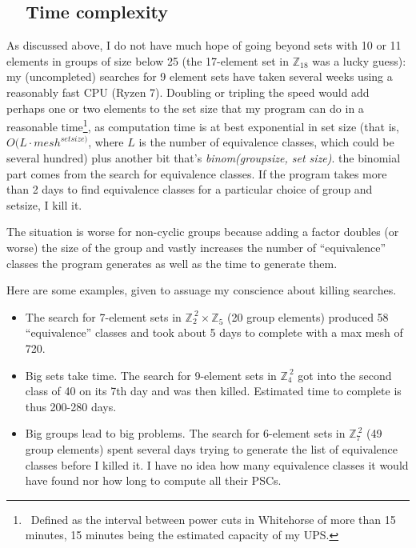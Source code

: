 \documentclass[letter,11pt]{amsart}
\numberwithin{theorem}{section}
\theoremstyle{remark}
\numberwithin{equation}{section}
\newcommand\Zp[2]{\texttt{$\mathbb Z_{#1}^{\	#2}$}}
\newcommand\proofBitFormat[1]{\textit{#1}}
\begin{document}
\subsection{\ \ Time complexity} \label{secTimeComplexity}  As discussed above,  I do not have much hope of going beyond sets with 10 or 11 elements in groups of size below 25 (the 17-element set
  in \Zp{18}{} was a lucky guess):  my (uncompleted) searches for 9 element sets
   have taken several weeks using a reasonably fast CPU (Ryzen 7). Doubling or tripling the speed would add 
   perhaps one or two elements to the set size that my program can do in a reasonable time\footnote{\ Defined as the interval between power cuts in Whitehorse of more than 15 minutes, 15 minutes being the
   estimated capacity of my UPS.}, as computation time is
  at best exponential in set size (that is, $O(L\cdot mesh^{setsize)} $, where $L$ is the  number of equivalence classes, which  could be several hundred) plus another bit that's \proofBitFormat{binom(groupsize, set size)}.  the binomial part comes from the search for equivalence classes.
  If the program takes more than 2 days to find equivalence classes for a particular choice of group and setsize, I 
  kill it.
  
The situation is worse for non-cyclic groups because adding a
 factor doubles (or worse) the size of the group and
vastly increases the number of ``equivalence'' classes the program 
generates as well as the time to generate them. 

Here are some examples, given to assuage my conscience about killing searches.
\begin{itemize}
  
\item The search for 7-element sets in $\Zp{2}{2}\times\Zp5{}$ (20 group elements)
 produced  58 ``equivalence'' classes and took about 5 days to complete with a max mesh of 720.

\item Big sets take time. The search for 9-element sets in \Zp42  got into the 
second class of 40 on its 7th day and was then killed. Estimated time to complete is thus 200-280 days. 


\item Big groups lead to big problems. The search for 6-element sets in \Zp72 (49 group elements) spent several
 days trying to generate the list of equivalence classes
  before I killed it. I have no idea how many equivalence classes it 
  would have found nor how long to compute all their PSCs.

\end{itemize}
    




\end{document}
